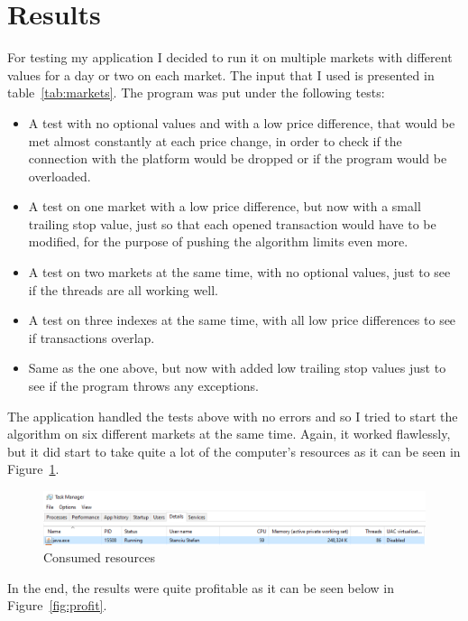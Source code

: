 \documentclass[12pt,a4paper]{report}
\begin{document}
\section{Results}
For testing my application I decided to run it on multiple markets with different values for a day or two on each market. The input that I used is presented in table~\ref{tab:markets}. The program was put under the following tests:
\begin{itemize}
	\item A test with no optional values and with a low price difference, that would be met almost constantly at each price change, in order to check if the connection with the platform would be dropped or if the program would be overloaded.
	\item A test on one market with a low price difference, but now with a small trailing stop value, just so that each opened transaction would have to be modified, for the purpose of pushing the algorithm limits even more.
	\item A test on two markets at the same time, with no optional values, just to see if the threads are all working well.
	\item A test on three indexes at the same time, with all low price differences to see if transactions overlap.
	\item Same as the one above, but now with added low trailing stop values just to see if the program throws any exceptions.
\end{itemize}
The application handled the tests above with no errors and so I tried to start the algorithm on six different markets at the same time. Again, it worked flawlessly, but it did start to take quite a lot of the computer's resources as it can be seen in Figure~\ref{fig:threads}.
\begin{figure}[!ht]
	\centering
	\includegraphics[scale=0.6]{pics/threads.png}
	\caption{Consumed resources}
	\label{fig:threads}
\end{figure}
\newpage
In the end, the results were quite profitable as it can be seen below in Figure~\ref{fig:profit}.
\end{document}
